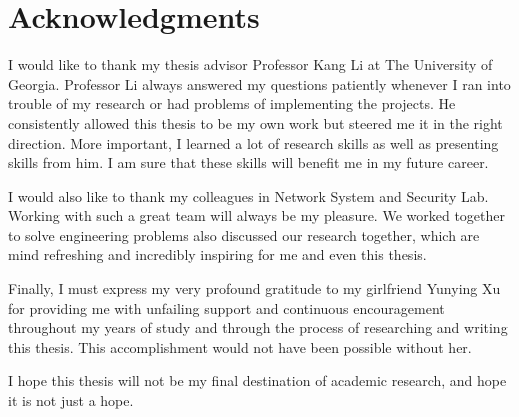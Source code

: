 \chapter*{Acknowledgments}

I would like to thank my thesis advisor Professor Kang Li at The University of Georgia. Professor Li always answered my questions patiently whenever I ran into trouble of my research or had problems of implementing the projects. He consistently allowed this thesis to be my own work but steered me it in the right direction. More important, I learned a lot of research skills as well as presenting skills from him. I am sure that these skills will benefit me in my future career.

I would also like to thank my colleagues in Network System and Security Lab. Working with such a great team will always be my pleasure. We worked together to solve engineering problems also discussed our research together, which are mind refreshing and incredibly inspiring for me and even this thesis. 

Finally, I must express my very profound gratitude to my girlfriend Yunying Xu for providing me with unfailing support and continuous encouragement throughout my years of study and through the process of researching and writing this thesis. This accomplishment would not have been possible without her.

I hope this thesis will not be my final destination of academic research, and hope it is not just a hope.